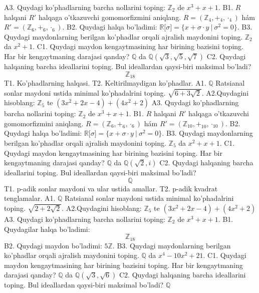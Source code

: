 A3. Quydagi ko'phadlarning barcha nollarini toping:
\(\mathbb{Z}_{2}\) de \(x^{3} + x + 1\).
B1. \(R\) halqani \(R'\) halqaga o'tkazuvchi gomomorfizmini aniqlang.
\(R = (\mathbb{Z}_{4}, +_{4}, \cdot_{4})\) hám \(R' = (\mathbb{Z}_{6}, +_{6}, \cdot_{6})\).
B2. Quydagi halqa bo'ladimi:
\(\mathbb{R\lbrack}\sigma\rbrack = \{ x + \sigma \cdot y\ |\ \sigma^{2} = 0\}\).
B3. Quydagi maydonlarning berilgan ko'phadlar orqali ajralish maydonini toping.
\(\mathbb{Z}_{2}\) da \(x^{2} + 1\).
C1. Quydagi maydon kengaytmasining har birining bazisini toping. Har bir kengaytmaning darajasi qanday?
\(\mathbb{Q}\) da \(\mathbb{Q}\left( \sqrt{3},\sqrt{5},\sqrt{7} \right)\)
C2. Quydagi halqaning barcha ideallarini toping. Bul ideallardan qaysi-biri maksimal bo'ladi?
\[\mathbb{Z}_{18}\]
T1. Ko'phadlarning halqasi.
T2. Keltirilmaydigan ko'phadlar.
A1. \(\mathbb{Q}\) Ratsianal sonlar maydoni ustida minimal ko'phadalrini toping.
\(\sqrt{6 + 3\sqrt{2}}\).
A2.Quydagini hisoblang:
\(\mathbb{Z}_{5}\) te \(\left( 3x^{2} + 2x - 4 \right) + \left( 4x^{2} + 2 \right)\)
A3. Quydagi ko'phadlarning barcha nollarini toping:
\(\mathbb{Z}_{2}\) de \(x^{3} + x + 1\).
B1. \(R\) halqani \(R'\) halqaga o'tkazuvchi gomomorfizmini aniqlang.
\(R = (\mathbb{Z}_{6}, +_{6}, \cdot_{6})\) hám \(R' = (\mathbb{Z}_{10}, +_{10}, \cdot_{10})\).
B2. Quydagi halqa bo'ladimi:
\(\mathbb{R\lbrack}\sigma\rbrack = \{ x + \sigma \cdot y\ |\ \sigma^{2} = 0\}\).
B3. Quydagi maydonlarning berilgan ko'phadlar orqali ajralish maydonini toping.
\(\mathbb{Z}_{5}\) da \(x^{2} + x + 1\).
C1. Quydagi maydon kengaytmasining har birining bazisini toping. Har bir kengaytmaning darajasi qanday?
\(\mathbb{Q}\) da \(\mathbb{Q}\left( \sqrt{2},i \right)\)
C2. Quydagi halqaning barcha ideallarini toping. Bul ideallardan qaysi-biri maksimal bo'ladi?
\[\mathbb{Q}\]
T1. p-adik sonlar maydoni va ular ustida amallar.
T2. p-adik kvadrat tenglamalar.
A1. \(\mathbb{Q}\) Ratsianal sonlar maydoni ustida minimal ko'phadalrini toping.
\(\sqrt{2 + 2\sqrt{2}}\).
A2.Quydagini hisoblang:
\(\mathbb{Z}_{5}\) te \(\left( 3x^{2} + 2x - 4 \right) + \left( 4x^{2} + 2 \right)\)
A3. Quydagi ko'phadlarning barcha nollarini toping:
\(\mathbb{Z}_{2}\) de \(x^{3} + x + 1\).
B1. Quydagilar halqa bo'ladimi:
\[\mathbb{Z}_{18}\]
B2. Quydagi maydon bo'ladimi:
\(5\mathbb{Z}\).
B3. Quydagi maydonlarning berilgan ko'phadlar orqali ajralish maydonini toping.
\(\mathbb{Q}\) da \(x^{4} - 10x^{2} + 21\).
C1. Quydagi maydon kengaytmasining har birining bazisini toping. Har bir kengaytmaning darajasi qanday?
\(\mathbb{Q}\) da \(\mathbb{Q}\left( \sqrt{3},\sqrt{6} \right)\)
C2. Quydagi halqaning barcha ideallarini toping. Bul ideallardan qaysi-biri maksimal bo'ladi? $\mathbb{Q}$